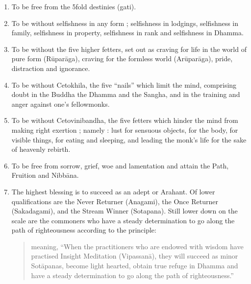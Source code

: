 \documentclass[a5paper,10pt,english]{book}
\begin{document}
\begin{enumerate}
\begin{enumerate}
\item {} 
\sphinxAtStartPar
To be free from the 5\sphinxhyphen{}fold destinies (gati).

\item {} 
\sphinxAtStartPar
To be without selfishness in any form ; selfishness in lodgings, selfishness in family, selfishness in property, selfishness in rank and selfishness in Dhamma.

\item {} 
\sphinxAtStartPar
To be without the five higher fetters, set out as craving for life in the world of pure form (Rūparāga), craving for the formless world (Arūparāga), pride, distraction and ignorance.

\item {} 
\sphinxAtStartPar
To be without Cetokhila, the five “nails” which limit the mind, comprising doubt in the Buddha the Dhamma and the Sangha, and in the training and anger against one’s fellow\sphinxhyphen{}monks.

\item {} 
\sphinxAtStartPar
To be without Cetovinibandha, the five fetters which hinder the mind from making right exertion ; namely : lust for sensuous objects, for the body, for visible things, for eating and sleeping, and leading the monk’s life for the sake of heavenly rebirth.

\item {} 
\sphinxAtStartPar
To be free from sorrow, grief, woe and lamentation and attain the Path, Fruition and Nibbāna.

\item {} 
\sphinxAtStartPar
The highest blessing is to succeed as an adept or Arahant. Of lower qualifications are the Never Returner (Anagami), the Once Returner (Sakadagami), and the Stream Winner (Sotapana). Still lower down on the scale are the commoners who have a steady determination to go along the path of righteousness according to the principle:
\begin{quote}

\sphinxAtStartPar
{} meaning, “When the practitioners who are endowed with wisdom have practised Insight Meditation (Vipassanā), they will succeed as minor Sotāpanas, become light hearted, obtain true refuge in Dhamma and have a steady determination to go along the path of righteousness.”
\end{quote}


\end{enumerate}
\end{enumerate}
\end{document}
